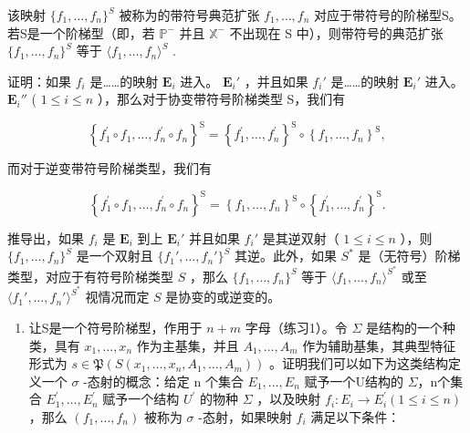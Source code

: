 该映射 \(\{f_1, \ldots, f_n\}^{S}\) 被称为的带符号典范扩张 \(f_1, \ldots, f_n\) 对应于带符号的阶梯型S。若S是一个阶梯型（即，若 \(\mathbb{P}^{-}\) 并且 \(\mathbb{X}^{-}\) 不出现在 S 中），则带符号的典范扩张 \(\{f_1, \ldots, f_n\}^{S}\) 等于 \(\langle f_1, \ldots, f_n \rangle^{S}\) .

证明：如果 \(f_{i}\) 是……的映射 \(\mathbf{E}_i\) 进入。 \(\mathbf{E}_i'\) ，并且如果 \(f_{i}'\) 是……的映射 \(\mathbf{E}_i'\) 进入。 \(\mathbf{E}_i''\) ( \(1 \leqslant i \leqslant n\) ），那么对于协变带符号阶梯类型 S，我们有

\[
\left\{f _ {1} ^ {\prime} \circ f _ {1}, \dots , f _ {n} ^ {\prime} \circ f _ {n} \right\} ^ {\mathrm{S}} = \left\{f _ {1} ^ {\prime}, \dots , f _ {n} ^ {\prime} \right\} ^ {\mathrm{S}} \circ \left\{f _ {1}, \dots , f _ {n} \right\} ^ {\mathrm{S}},
\]

而对于逆变带符号阶梯类型，我们有

\[
\left\{f _ {1} ^ {\prime} \circ f _ {1}, \dots , f _ {n} ^ {\prime} \circ f _ {n} \right\} ^ {\mathrm{S}} = \left\{f _ {1}, \dots , f _ {n} \right\} ^ {\mathrm{S}} \circ \left\{f _ {1} ^ {\prime}, \dots , f _ {n} ^ {\prime} \right\} ^ {\mathrm{S}}.
\]

推导出，如果 \(f_i\) 是 \(\mathbf{E}_i\) 到上 \(\mathbf{E}_i'\) 并且如果 \(f_i'\) 是其逆双射（ \(1 \leqslant i \leqslant n\) ），则 \(\{f_1, \ldots, f_n\}^S\) 是一个双射且 \(\{f_1', \ldots, f_n'\}^S\) 其逆。此外，如果 \(S^*\) 是（无符号）阶梯类型，对应于有符号阶梯类型 \(S\) ，那么 \(\{f_1, \ldots, f_n\}^S\) 等于 \(\langle f_1, \ldots, f_n \rangle^{S^*}\) 或至 \(\langle f_1', \ldots, f_n' \rangle^{S^*}\) 视情况而定 \(S\) 是协变的或逆变的。

\begin{enumerate}
\def\labelenumi{\arabic{enumi}.}
\setcounter{enumi}{1}
\tightlist
\item
  让S是一个符号阶梯型，作用于 \(n + m\) 字母（练习1）。令 \(\Sigma\) 是结构的一个种类，具有 \(x_{1}, \ldots, x_{n}\) 作为主基集，并且 \(A_{1}, \ldots, A_{m}\) 作为辅助基集，其典型特征形式为 \(s \in \mathfrak{P}(S(x_{1}, \ldots, x_{n}, A_{1}, \ldots, A_{m}))\) 。证明我们可以如下为这类结构定义一个 \(\sigma\) -态射的概念：给定 n 个集合 \(E_{1}, \ldots, E_{n}\) 赋予一个U结构的 \(\Sigma\)，n个集合 \(E_{1}^{\prime}, \ldots, E_{n}^{\prime}\) 赋予一个结构 \(U^{\prime}\) 的物种 \(\Sigma\) ，以及映射 \(f_{i}: E_{i} \to E_{i}^{\prime} (1 \leqslant i \leqslant n)\) ，那么 \((f_{1}, \ldots, f_{n})\) 被称为 \(\sigma\) -态射，如果映射 \(f_{i}\) 满足以下条件：
\end{enumerate}

